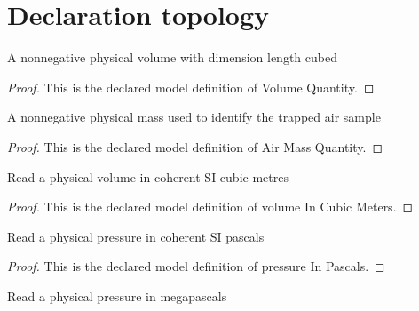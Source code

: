\section{Declaration topology}
\begin{definition}
  \label{def:physics:phyx-mini-0443:phyxminiproblems-problemphyxmini0443-volumequantity}
  A nonnegative physical volume with dimension length cubed
\end{definition}
\begin{proof}
  This is the declared model definition of Volume Quantity.
\end{proof}
\begin{definition}
  \label{def:physics:phyx-mini-0443:phyxminiproblems-problemphyxmini0443-airmassquantity}
  A nonnegative physical mass used to identify the trapped air sample
\end{definition}
\begin{proof}
  This is the declared model definition of Air Mass Quantity.
\end{proof}
\begin{definition}
  \label{def:physics:phyx-mini-0443:phyxminiproblems-problemphyxmini0443-volumeincubicmeters}
  Read a physical volume in coherent SI cubic metres
\end{definition}
\begin{proof}
  This is the declared model definition of volume In Cubic Meters.
\end{proof}
\begin{definition}
  \label{def:physics:phyx-mini-0443:phyxminiproblems-problemphyxmini0443-pressureinpascals}
  Read a physical pressure in coherent SI pascals
\end{definition}
\begin{proof}
  This is the declared model definition of pressure In Pascals.
\end{proof}
\begin{definition}
  \label{def:physics:phyx-mini-0443:phyxminiproblems-problemphyxmini0443-pressureinmegapascals}
  Read a physical pressure in megapascals
\end{definition}
